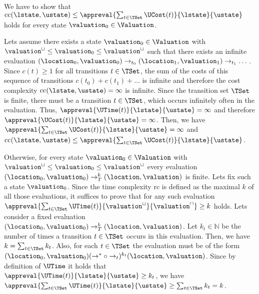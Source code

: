We have to show that $\text{cc}(\lstate, \ustate) \leq \appreval{\sum_{t \in \TSet}\UCost(t)}{\lstate}{\ustate}$ holds for every state $\valuation_0 \in \Valuation$.

Lets assume there exists a state $\valuation_0 \in \Valuation$ with $\valuation^\sqcup \leq \valuation_0 \leq \valuation^\sqcup$ such that there exists an infinite evaluation $(\location_0, \valuation_0) \rightarrow_{t_0} (\location_1, \valuation_1) \rightarrow_{t_1} \dots$.
Since $c(t) \geq 1$ for all transitions $t \in \TSet$, the sum of the costs of this sequence of transitions $c(t_0) + c(t_1) + \dots$ is infinite and therefore the cost complexity $\text{cc}(\lstate, \ustate) = \infty$ is infinite.
Since the transition set $\TSet$ is finite, there must be a transition $t \in \TSet$, which occurs infinitely often in the evaluation.
Thus, $\appreval{\UTime(t)}{\lstate}{\ustate} = \infty$ and therefore $\appreval{\UCost(t)}{\lstate}{\ustate} = \infty$.
Then, we have $\appreval{\sum_{t \in \TSet}\UCost(t)}{\lstate}{\ustate} = \infty$ and $\text{cc}(\lstate, \ustate) \leq \appreval{\sum_{t \in \TSet}\UCost(t)}{\lstate}{\ustate}$.


Otherwise, for every state $\valuation_0 \in \Valuation$ with $\valuation^\sqcup \leq \valuation_0 \leq \valuation^\sqcup$ every evaluation $(\location_0, \valuation_0) \rightarrow^k_T (\location, \valuation)$ is finite.
Lets fix such a state $\valuation_0$.
Since the time complexity $\text{rc}$ is defined as the maximal $k$ of all those evaluations, it suffices to prove that for any such evaluation $\appreval{\sum_{t \in \TSet}\UTime(t)}{\valuation^\sqcup}{\valuation^\sqcap} \geq k$ holds.
Lets consider a fixed evaluation $(\location_0, \valuation_0) \rightarrow^k_T (\location, \valuation)$.
Let $k_t \in \mathbb{N}$ be the number of times a transition $t \in \TSet$ occurs in this evaluation.
Then, we have $k = \sum_{t \in \TSet} k_t$.
Also, for each $t \in \TSet$ the evaluation must be of the form $(\location_0, \valuation_0) (\rightarrow^* \circ \rightarrow_t)^{k_t} (\location, \valuation)$.
Since by definition of $\UTime$ it holds that $\appreval{\UTime(t)}{\lstate}{\ustate} \geq k_t$, we have $\appreval{\sum_{t \in \TSet}\UTime(t)}{\lstate}{\ustate} \geq \sum_{t \in \TSet} k_t = k$.
